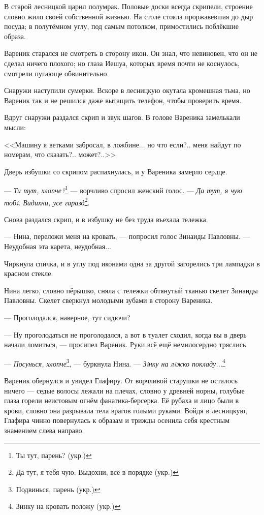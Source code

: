 \asterism

В старой лесницкой царил полумрак.
Половые доски всегда скрипели, строение словно жило своей собственной жизнью.
На столе стояла проржавевшая до дыр посуда;
в полутёмном углу, под самым потолком, примостились поблёкшие образа.

Вареник старался не смотреть в сторону икон.
Он знал, что невиновен, что он не сделал ничего плохого;
но глаза Иешуа, которых время почти не коснулось, смотрели пугающе обвинительно.

Снаружи наступили сумерки.
Вскоре в лесницкую окутала кромешная тьма, но Вареник так и не решился даже вытащить телефон, чтобы проверить время.

Вдруг снаружи раздался скрип и звук шагов.
В голове Вареника замелькали мысли:

<<Машину я ветками забросал, в ложбине... но что если?.. меня найдут по номерам, что сказать?.. может?..>>

Дверь избушки со скрипом распахнулась, и у Вареника замерло сердце.

--- \textit{Ти тут, хлопче?}\footnote{Ты тут, парень? (укр.)} --- ворчливо спросил женский голос.
--- \textit{Да тут, я чую тобi.}
\textit{Видихни, усе гаразд}\footnote{Да тут, я тебя чую. Выдохни, всё в порядке (укр.)}.

Снова раздался скрип, и в избушку не без труда въехала тележка.

--- Нина, переложи меня на кровать, --- попросил голос Зинаиды Павловны.
--- Неудобная эта карета, неудобная...

Чиркнула спичка, и в углу под иконами одна за другой загорелись три лампадки в красном стекле.

Нина легко, словно пёрышко, сняла с тележки обтянутый тканью скелет Зинаиды Павловны.
Скелет сверкнул молодыми зубами в сторону Вареника.

--- Проголодался, наверное, тут сидючи?

--- Ну проголодаться не проголодался, а вот в туалет сходил, когда вы в дверь начали ломиться, --- просипел Вареник.
Руки всё ещё немилосердно тряслись.

--- \textit{Посунься, хлопче}\footnote{Подвинься, парень (укр.)}, --- буркнула Нина.
--- \textit{Зiнку на лiжко покладу...}\footnote{Зинку на кровать положу (укр.)}

\asterism

\textspace

Вареник обернулся и увидел Глафиру.
От ворчливой старушки не осталось ничего --- седые волосы лежали на плечах, словно у древней норны, голубые глаза горели неистовым огнём фанатика-берсерка.
Её рубаха и лицо были в крови, словно она разрывала тела врагов голыми руками.
Войдя в лесницкую, Глафира чинно повернулась к образам и трижды осенила себя крестным знамением слева направо.

